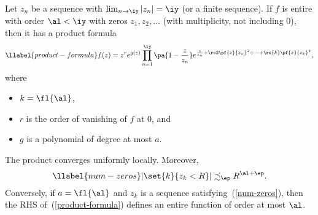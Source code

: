 \begin{thm}
Let $z_n$ be a sequence with $\lim_{n\to \iy} |z_n|=\iy$ (or a finite sequence).
If $f$ is entire with order $\al<\iy$ with zeros $z_1,z_2,\ldots$ (with multiplicity, not including 0), then it has a product formula
\begin{equation}\llabel{product-formula}
f(z)=z^re^{g(z)} \prod_{n=1}^{\iy} \pa{1-\frac{z}{z_n}}e^{
\frac{z}{z_n}+\rc2 \pf{z}{z_n}^2+\cdots +\rc{k}\pf{z}{z_k}^{k}
},
\end{equation}
where
\begin{itemize}
\item $k=\fl{\al}$,
\item $r$ is the order of vanishing of $f$ at 0, and
\item $g$ is a polynomial of degree at most $a$.
\end{itemize}
The product converges uniformly locally. Moreover, 
\begin{equation}\llabel{num-zeros}
|\set{k}{z_k<R}|\precsim_{\ep} R^{\al+\ep}.
\end{equation}
Conversely, if $a=\fl{\al}$ and $z_k$ is a sequence satisfying~(\ref{num-zeros}), then the RHS of~(\ref{product-formula}) defines an entire function of order at most $\al$.
\end{thm}
